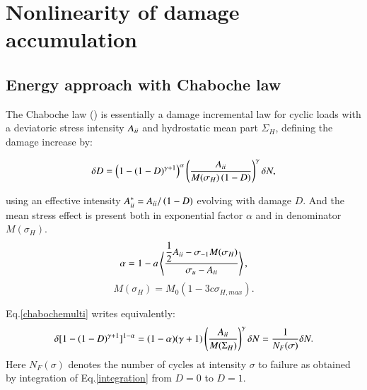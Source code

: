 \documentclass[3p,times,procedia,number]{elsarticle}
\begin{document}
\section{Nonlinearity of damage accumulation}
\label{sec:5.6}
\subsection{Energy approach with Chaboche law}
The Chaboche law (\cite{lemaitre1990mechanics}) is essentially a damage incremental law for cyclic loads with a deviatoric stress intensity ${A}_{\uppercase\expandafter{\romannumeral2}}$ and hydrostatic mean part $\Sigma_H$, defining the damage increase by:

\begin{equation}\delta D = \left( 1 -(1-D)^{\gamma+1}\right)^\alpha \left(\frac{{A}_{\uppercase\expandafter{\romannumeral2}} }{M(\sigma_H)\left( 1-D\right)}\right)^\gamma \delta N ,
\label{chabochemulti}
\end{equation} 

using an effective intensity ${A}_{\uppercase\expandafter{\romannumeral2}}^*={A}_{\uppercase\expandafter{\romannumeral2}}/\left( 1-D\right) $ evolving with damage $D$. And the mean stress effect is present both in exponential factor $\alpha$ and in denominator $M(\sigma_H)$.
$$\alpha=1 - a\left\langle \dfrac{\dfrac{1}{2}{A}_{\uppercase\expandafter{\romannumeral2}}-\sigma_{-1}M(\sigma_H) }{\sigma_{u} -{A}_{\uppercase\expandafter{\romannumeral2}}}\right\rangle,$$
$$M(\sigma_H) =M_0 \left(1-3c\sigma_{H,max}\right).$$

Eq.\eqref{chabochemulti} writes equivalently:
\begin{equation}\delta [1-(1-D)^{\gamma+1}]^{1-\alpha}=(1-\alpha)(\gamma+1)\left(\dfrac{{A}_{\uppercase\expandafter{\romannumeral2}} }{M(\Sigma_H)}\right)^\gamma \delta N=\dfrac{1}{N_F(\sigma)}\delta N.
\label{integration}
\end{equation}
Here $N_F(\sigma)$ denotes the number of cycles at intensity $\sigma$ to failure as obtained by integration of Eq.\eqref{integration} from $D=0$ to $D=1$. 

%
%
\end{document}
